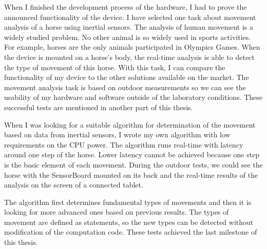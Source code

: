 When I finished the development process of the hardware, I had to prove the announced functionality of the device. I have selected one task about movement analysis of a horse using inertial sensors. The analysis of human movement is a widely studied problem. No other animal is so widely used in sports activities. For example, horses are the only animals participated in Olympics Games. When the device is mounted on a horse's body, the real-time analysis is able to detect the type of movement of this horse. With this task, I can compare the functionality of my device to the other solutions available on the market. The movement analysis task is based on outdoor measurements so we can see the usability of my hardware and software outside of the laboratory conditions. These successful tests are mentioned in another part of this thesis.

When I was looking for a suitable algorithm for determination of the movement based on data from inertial sensors, I wrote my own algorithm with low requirements on the CPU power. The algorithm runs real-time with latency around one step of the horse. Lower latency cannot be achieved because one step is the basic element of each movement. During the outdoor tests, we could see the horse with the SensorBoard mounted on its back and the real-time results of the analysis on the screen of a connected tablet.

The algorithm first determines fundamental types of movements and then it is looking for more advanced ones based on previous results. The types of movement are defined as statements, so the new types can be detected without modification of the computation code. These tests achieved the last milestone of this thesis.
